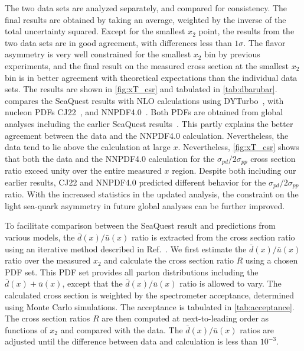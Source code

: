 \documentclass[reprint,aps,unsortedaddress,superscriptaddress,prl,floatfix,showpacs,linenumbers]{revtex4-2}
\begin{document}
The two data sets are analyzed separately, and compared for consistency.
The final results are obtained by taking an average,
weighted by the inverse of the total uncertainty squared.
Except for the smallest $x_2$ point, the results from the two data sets are in good agreement,
with differences less than $1\sigma$.
The flavor asymmetry is very well constrained for the smallest $x_2$ bin by previous experiments,
and the final result on the measured cross section at the smallest $x_2$ bin is in better agreement
with theoretical expectations than the individual data sets.
The results are shown in \cref{fig:xT_csr} and tabulated in \cref{tab:dbarubar}.
 compares the SeaQuest results with
NLO calculations using DYTurbo~\cite{camarda2020},
with nucleon PDFs  CJ22~\cite{accardi2023}, and NNPDF4.0~\cite{ball2022a}.
Both PDFs are obtained from global analyses including
the earlier SeaQuest results~\cite{dove2021}.
This partly explains the better agreement between the data and the NNPDF4.0 calculation. Nevertheless, the data tend to lie above the calculation at large $x$.
Nevertheless, \cref{fig:xT_csr}
shows that both the data and the NNPDF4.0 calculation for the
$\sigma_{pd}/2\sigma_{pp}$ cross section ratio exceed unity over the
entire measured $x$ region.
Despite both including our earlier results,
CJ22 and NNPDF4.0 predicted different behavior for the $\sigma_{pd}/2\sigma_{pp}$ ratio.
With the increased statistics in the updated analysis,
the constraint on the light sea-quark asymmetry in future global analyses can be further improved.

To facilitate comparison between the SeaQuest result and predictions
from various models, the $\bar{d}(x)/\bar{u}(x)$ ratio is extracted from the
cross section ratio using an iterative method described in
Ref.~\cite{dove2021}.
We first estimate the $\bar{d}(x)/\bar{u}(x)$ ratio over the measured $x_2$
and calculate the cross section ratio $R$ using a chosen PDF set.
This PDF set provides all parton distributions including the
$\bar{d}(x)+\bar{u}(x)$, except that the $\bar{d}(x)/\bar{u}(x)$
ratio is allowed to vary.
The calculated cross section is weighted by the spectrometer acceptance, determined using Monte Carlo simulations.
The acceptance is tabulated in \cref{tab:acceptance}.
The cross section ratios $R$ are then computed at next-to-leading order
as functions of $x_2$ and compared with the data. The $\bar{d}(x)/\bar{u}(x)$
ratios are adjusted until the difference between data and
calculation is less than $10^{-3}$.
\end{document}
